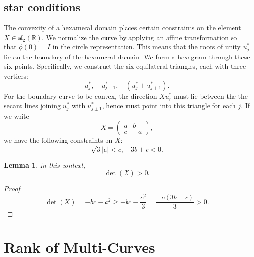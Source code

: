 \documentclass[11pt]{amsart}
\newtheorem{lemma}{Lemma}
\newcommand{\ring}[1]{\mathbb{#1}}
\begin{document}
\subsection{star conditions}\label{sec:star}

The convexity of a hexameral domain places certain constraints on the
element $X\in\mathfrak{sl}_2(\ring{R})$.  We normalize the curve by applying
an affine transformation so that $\phi(0)=I$ in the circle representation.
This means that the roots of unity $u^*_j$ lie on the boundary of 
the hexameral domain.  We form a hexagram through these six points.
Specifically, we construct the six equilateral triangles, each with three
vertices:
   $$
   u^*_j,\quad u^*_{j+1},\quad (u^*_j + u^*_{j+1}).
$$
For the boundary curve to be convex, the direction $X u^*_j$ must lie between
the the secant lines joining $u^*_j$ with $u^*_{j\pm 1}$, hence
must point into this triangle for each $j$.  If we write
$$X  = \left(\begin{matrix} a & b \\ c & -a \end{matrix}\right),$$
we have the following constraints on $X$:
$$
\sqrt{3} |a| < c,\quad 3 b + c < 0.
$$

\begin{lemma}
In this context,
$$\det(X) > 0.$$
\end{lemma}

\begin{proof} 
$$\det(X) = - b c - a^2 \ge - b c  - \frac{c^2}{3} = \frac{-c(3 b + c)}{3} >0.$$
\end{proof}



\section{Rank of Multi-Curves}


\end{document}
